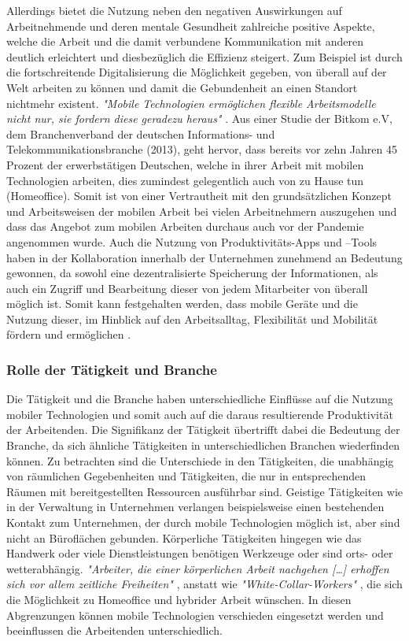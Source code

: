 \documentclass[12pt,a4paper]{article}
\begin{document}
Allerdings bietet die Nutzung neben den negativen Auswirkungen auf Arbeitnehmende und deren mentale Gesundheit zahlreiche positive Aspekte, welche die Arbeit und die damit verbundene Kommunikation mit anderen deutlich erleichtert und diesbezüglich die Effizienz steigert.
Zum Beispiel ist durch die fortschreitende Digitalisierung die Möglichkeit gegeben, von überall auf der Welt arbeiten zu können und damit die Gebundenheit an einen Standort nichtmehr existent. 
\emph{"Mobile Technologien ermöglichen flexible Arbeitsmodelle nicht nur, sie fordern diese geradezu heraus"} \parencite[Stephan Pfisterer, S.9,][]{arbeit30}.
Aus einer Studie der Bitkom e.V, dem Branchenverband der deutschen Informations- und Telekommunikationsbranche (2013), geht hervor, dass bereits vor zehn Jahren 45 Prozent der erwerbstätigen Deutschen, welche in ihrer Arbeit mit mobilen Technologien arbeiten, dies zumindest gelegentlich auch von zu Hause tun (Homeoffice). Somit ist von einer Vertrautheit mit den grundsätzlichen Konzept und Arbeitsweisen der mobilen Arbeit bei vielen Arbeitnehmern auszugehen und dass das Angebot zum mobilen Arbeiten durchaus auch vor der Pandemie angenommen wurde.
Auch die Nutzung von Produktivitäts-Apps und –Tools haben in der Kollaboration innerhalb der Unternehmen zunehmend an Bedeutung gewonnen, da sowohl eine dezentralisierte Speicherung der Informationen, als auch ein Zugriff und Bearbeitung dieser von jedem Mitarbeiter von überall möglich ist.
Somit kann festgehalten werden, dass mobile Geräte und die Nutzung dieser, im Hinblick auf den Arbeitsalltag, Flexibilität und Mobilität fördern und ermöglichen \parencite[vgl.][]{arbeit30}. 
 
\subsubsection*{Rolle der Tätigkeit und Branche}
Die Tätigkeit und die Branche haben unterschiedliche Einflüsse auf die Nutzung mobiler Technologien und somit auch auf die daraus resultierende Produktivität der Arbeitenden. 
Die Signifikanz der Tätigkeit übertrifft dabei die Bedeutung der Branche, da sich ähnliche Tätigkeiten in unterschiedlichen Branchen wiederfinden können. 
Zu betrachten sind die Unterschiede in den Tätigkeiten, die unabhängig von räumlichen Gegebenheiten und Tätigkeiten, die nur in entsprechenden Räumen mit bereitgestellten Ressourcen ausführbar sind. 
Geistige Tätigkeiten wie in der Verwaltung in Unternehmen verlangen beispielsweise einen bestehenden Kontakt zum Unternehmen, der durch mobile Technologien möglich ist, aber sind nicht an Büroflächen gebunden. 
Körperliche Tätigkeiten hingegen wie das Handwerk oder viele Dienstleistungen benötigen Werkzeuge oder sind orts- oder wetterabhängig.
\emph{"Arbeiter, die einer körperlichen Arbeit nachgehen […] erhoffen sich vor allem zeitliche Freiheiten"} \parencite{frenz1963definition}, anstatt wie \emph{"White-Collar-Workers"} \parencite{frenz1963definition}, die sich die Möglichkeit zu Homeoffice und hybrider Arbeit wünschen. 
In diesen Abgrenzungen können mobile Technologien verschieden eingesetzt werden und beeinflussen die Arbeitenden unterschiedlich. 
\end{document}
